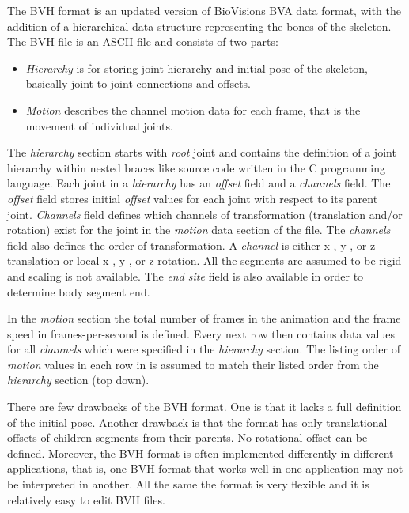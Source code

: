 \documentclass[times, 10pt,twocolumn]{article}
\begin{document}
\label{bvh_description}
The BVH format is an updated version of BioVisions BVA data format, with the addition of a
hierarchical data structure representing the bones of the skeleton.
The BVH file is an ASCII file and consists of two parts:

\begin{itemize}
\item \emph{Hierarchy} is for storing joint hierarchy and initial pose of the skeleton,
basically joint-to-joint connections and offsets.
\item \emph{Motion} describes the channel motion data for each frame,
that is the movement of individual joints.
\end{itemize}

The \emph{hierarchy} section starts with \emph{root} joint and contains the definition of a joint hierarchy within nested braces like source code written in the C programming language.
Each joint in a \emph{hierarchy} has an \emph{offset} field and a \emph{channels} field.
The \emph{offset} field stores initial \emph{offset} values for each joint with respect to its parent joint.
\emph{Channels} field defines which channels of transformation (translation and/or rotation) exist for the joint in
the \emph{motion} data section of the file. The \emph{channels} field also defines the order of transformation. A
\emph{channel} is either x-, y-, or z-translation or local x-, y-, or z-rotation. All the segments are assumed
to be rigid and scaling is not available.
The \emph{end site} field is also available in order to determine body segment end.

In the \emph{motion} section the total number of frames in the animation and the frame
speed in frames-per-second is defined. Every next row then contains data values for all \emph{channels} which were specified in the \emph{hierarchy} section.
The listing order of \emph{motion} values in each row in is assumed to match their listed order from the \emph{hierarchy} section (top down).

There are few drawbacks of the BVH format. One is that it lacks a full definition of the initial pose. Another
drawback is that the format has only translational offsets of children segments from their parents. No
rotational offset can be defined. Moreover, the BVH format is often implemented differently in different
applications, that is, one BVH format that works well in one application may not be interpreted
in another. All the same the format is very flexible and it is relatively easy to edit BVH files.
\end{document}
